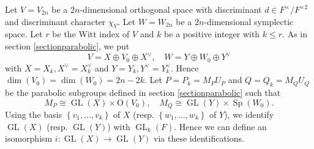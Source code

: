 \documentclass[article]{article}
\numberwithin{equation}{section}
\theoremstyle{definition}
\DeclareMathOperator{\GL}{GL}
\DeclareMathOperator{\SP}{Sp}
\begin{document}
Let $V=V_{2n}$ be a $2n$-dimensional orthogonal space with discriminant $d\in F^{\times}/F^{\times 2}$ and discriminant character $\chi_{V}$. Let $W=W_{2n}$ be a $2n$-dimensional symplectic space. Let $r$ be the Witt index of $V$ and $k$ be a positive integer with $k\leq r$. As in section \ref{sectionparabolic}, we put 
$$V=X\oplus V_0\oplus X^{\vee}, \quad W=Y\oplus W_0\oplus Y^{\vee}$$
with $X=X_{k}, X^{\vee}=X_{k}^{\vee}$ and $Y=Y_{k}, Y^{\vee}=Y_{k}^{\vee}$. Hence $\dim(V_0)=\dim(W_0)=2n-2k$. Let $P=P_{k}=M_{P} U_{P}$ and $Q=Q_{k}=M_{Q} U_{Q}$ be the parabolic subgroups defined in section \ref{sectionparabolic} such that 
$$M_{P} \cong \GL(X) \times \mathrm O(V_0), \quad M_{Q} \cong \GL(Y) \times \SP(W_0).$$
Using the basis $\left\{v_{1}, \ldots, v_{k}\right\}$ of $X$ (resp. $\left\{w_{1}, \ldots, w_{k}\right\}$ of $Y$), we identify $\GL(X)$ (resp. $\GL(Y)$) with $\GL_k(F)$. Hence we can define an isomorphism $i: \GL(X) \rightarrow \GL(Y) $ via these identifications.  
\end{document}
